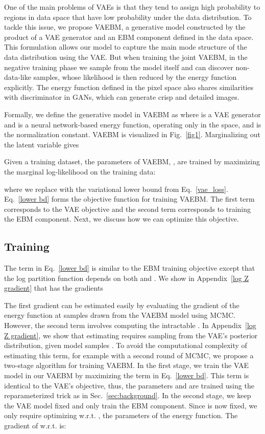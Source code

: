\documentclass{article} \usepackage{iclr2021_conference,times}
\begin{document}
One of the main problems of VAEs is that they tend to assign high probability to regions in data space that have low probability under the data distribution. To tackle this issue, we propose VAEBM, a generative model constructed by the product of a VAE generator and an EBM component defined in the data space. This formulation allows our model to capture the main mode structure of the data distribution using the VAE. 
But when training the joint VAEBM, in the negative training phase we sample from the model itself and can discover non-data-like samples, whose likelihood is then reduced by the energy function explicitly.
The energy function defined in the pixel space also shares similarities with discriminator in GANs, which can generate crisp and detailed images.

Formally, we define the generative model in VAEBM as  where  is a VAE generator and  is a neural network-based energy function, operating only in the  space, and  is the normalization constant.
VAEBM is visualized in Fig.~\ref{fig1}. Marginalizing out the latent variable  gives

Given a training dataset, the parameters of VAEBM, , are trained by maximizing the marginal log-likelihood on the training data:

where we replace  with the variational lower bound from Eq.~\ref{vae_loss}. Eq.~\ref{lower bd} forms the objective function for training VAEBM. The first term corresponds to the VAE objective and the second term corresponds to training the EBM component. Next, we discuss how we can optimize this objective.



\subsection{Training}\label{sec training}
The  term in Eq.~\ref{lower bd} is similar to the EBM training objective except that the log partition function depends on both  and . We show in Appendix~\ref{log Z gradient} that  has the gradients

\iffalse

\fi
The first gradient can be estimated easily by evaluating the gradient of the energy function at samples drawn from the VAEBM model  using MCMC.
However, the second term involves computing the intractable . In Appendix~\ref{log Z gradient}, we show that estimating  requires sampling from the VAE's posterior distribution, given model samples . To avoid the computational complexity of estimating this term, for example with a second round of MCMC, we propose a two-stage algorithm for training VAEBM. In the first stage, we train the VAE model in our VAEBM by maximizing the  term in Eq.~\ref{lower bd}. This term is identical to the VAE's objective, thus, the parameters  and  are trained using the reparameterized trick as in Sec.~\ref{sec:background}. In the second stage, we keep the VAE model fixed and only train the EBM component. Since  is now fixed, we only require optimizing  w.r.t. , the parameters of the energy function. The gradient of  w.r.t.  is:
\end{document}
